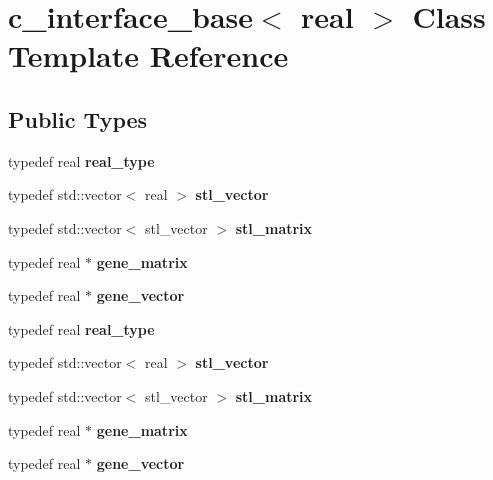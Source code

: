 \hypertarget{classc__interface__base}{}\section{c\+\_\+interface\+\_\+base$<$ real $>$ Class Template Reference}
\label{classc__interface__base}
\subsection*{Public Types}
\begin{DoxyCompactItemize}
\item 
\mbox{\label{classc__interface__base_ad633253213995673dd204956a64d2344}} 
typedef real {\bfseries real\+\_\+type}
\item 
\mbox{\label{classc__interface__base_aa36cc87716b5f1f28df4d5ce296f5758}} 
typedef std\+::vector$<$ real $>$ {\bfseries stl\+\_\+vector}
\item 
\mbox{\label{classc__interface__base_ab803c3848066af7b2863deb4943ea629}} 
typedef std\+::vector$<$ stl\+\_\+vector $>$ {\bfseries stl\+\_\+matrix}
\item 
\mbox{\label{classc__interface__base_a441f86a63f9d26d4def30180a0f73f73}} 
typedef real $\ast$ {\bfseries gene\+\_\+matrix}
\item 
\mbox{\label{classc__interface__base_a41ecd7165bc439ba58927db7237043a6}} 
typedef real $\ast$ {\bfseries gene\+\_\+vector}
\item 
\mbox{\label{classc__interface__base_ad633253213995673dd204956a64d2344}} 
typedef real {\bfseries real\+\_\+type}
\item 
\mbox{\label{classc__interface__base_aa36cc87716b5f1f28df4d5ce296f5758}} 
typedef std\+::vector$<$ real $>$ {\bfseries stl\+\_\+vector}
\item 
\mbox{\label{classc__interface__base_ab803c3848066af7b2863deb4943ea629}} 
typedef std\+::vector$<$ stl\+\_\+vector $>$ {\bfseries stl\+\_\+matrix}
\item 
\mbox{\label{classc__interface__base_a441f86a63f9d26d4def30180a0f73f73}} 
typedef real $\ast$ {\bfseries gene\+\_\+matrix}
\item 
\mbox{\label{classc__interface__base_a41ecd7165bc439ba58927db7237043a6}} 
typedef real $\ast$ {\bfseries gene\+\_\+vector}
\end{DoxyCompactItemize}
